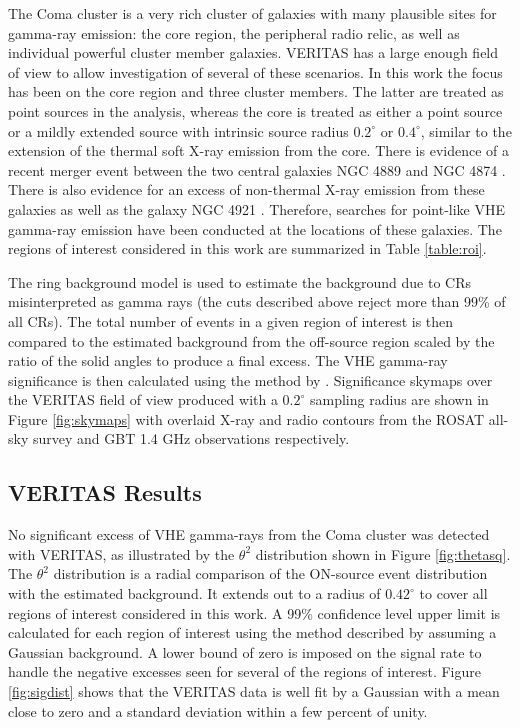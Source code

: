 \documentclass[12pt,manuscript]{aastex}
\begin{document}
The Coma cluster is a very rich cluster of galaxies with many plausible sites for gamma-ray
emission: the core region, the peripheral radio relic, as well as individual powerful cluster
member galaxies. VERITAS has a large enough field of view to allow investigation of several of
these scenarios. In this work the focus has been on the core region and three cluster members. The
latter are treated as point sources in the analysis, whereas the core is treated as either a point
source or a mildly extended source with intrinsic source radius $0.2^{\circ}$ or $0.4^{\circ}$,
similar to the extension of the thermal soft X-ray emission from the core. There
is evidence of a recent merger event between the two central galaxies NGC 4889 and NGC 4874
\citep{article:Tribble:1993}. There is also evidence for an excess of non-thermal X-ray emission
from these galaxies as well as the galaxy NGC 4921 \citep{article:Neumann_etal:2003}. Therefore,
searches for point-like VHE gamma-ray emission have been conducted at the locations of these
galaxies. The regions of interest considered in this work are summarized in Table \ref{table:roi}.

The ring background model \citep{article:Aharonian_etal:2001} is used to estimate the background
due to CRs misinterpreted as gamma rays (the cuts described above reject more than 99\% of all
CRs). The total number of events in a given region of interest is then compared to the estimated
background from the off-source region scaled by the ratio of the solid angles to produce a final
excess. The VHE gamma-ray significance is then calculated using the method by
\citet{article:LiMa:1983}. Significance skymaps over the VERITAS field of view produced with a
$0.2^{\circ}$ sampling radius are shown in Figure \ref{fig:skymaps} with overlaid X-ray and radio
contours from the ROSAT all-sky survey \citep{article:BrielHenryBohringer:1992}  and GBT 1.4 GHz
observations \citep{article:BrownRudnick:2010} respectively.

%
%

\subsection{VERITAS Results}
No significant excess of VHE gamma-rays from the Coma cluster was detected with VERITAS, as
illustrated by the $\theta^{2}$ distribution shown in Figure \ref{fig:thetasq}. The $\theta^{2}$
distribution is a radial comparison of the ON-source event distribution with the estimated
background. It extends out to a radius of $0.42^{\circ}$ to cover all regions of interest
considered in this work. A 99\% confidence level upper limit is calculated for each region of
interest using the method described by \citet{article:Rolke_etal:2005} assuming a Gaussian
background. A lower bound of zero is imposed on the signal rate to handle the negative excesses
seen for several of the regions of interest. Figure \ref{fig:sigdist} shows that the VERITAS data
is well fit by a Gaussian with a mean close to zero and a standard deviation within a few percent
of unity. 
\end{document}
